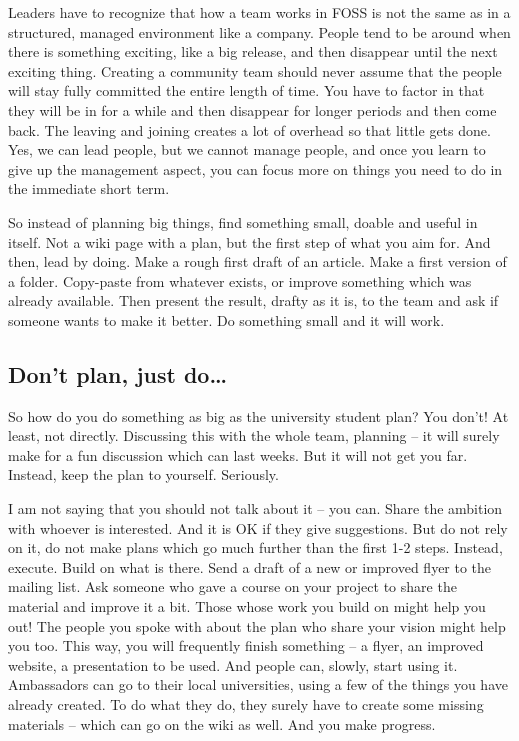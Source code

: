 Leaders have to recognize that how a team works in FOSS is not the same as in a
structured, managed environment like a company. People tend to be around when
there is something exciting, like a big release, and then disappear until the
next exciting thing. Creating a community team should never assume that the
people will stay fully committed the entire length of time. You have to factor
in that they will be in for a while and then disappear for longer periods and
then come back. The leaving and joining creates a lot of overhead so that little
gets done. Yes, we can lead people, but we cannot manage people, and once you
learn to give up the management aspect, you can focus more on things you need to
do in the immediate short term.

So instead of planning big things, find something small, doable and useful in
itself. Not a wiki page with a plan, but the first step of what you aim for. And
then, lead by doing. Make a rough first draft of an article. Make a first
version of a folder. Copy-paste from whatever exists, or improve something which
was already available. Then present the result, drafty as it is, to the team and
ask if someone wants to make it better. Do something small and it will work.

\subsection*{Don't plan, just do\dots}
So how do you do something as big as the university student plan? You don't! At
least, not directly. Discussing this with the whole team, planning -- it will
surely make for a fun discussion which can last weeks. But it will not get you
far. Instead, keep the plan to yourself. Seriously.

I am not saying that you should not talk about it -- you can. Share the ambition
with whoever is interested. And it is OK if they give suggestions. But do not
rely on it, do not make plans which go much further than the first 1-2 steps.
Instead, execute. Build on what is there. Send a draft of a new or improved
flyer to the mailing list. Ask someone who gave a course on your project to
share the material and improve it a bit. Those whose work you build on might
help you out! The people you spoke with about the plan who share your vision
might help you too. This way, you will frequently finish something -- a flyer,
an improved website, a presentation to be used. And people can, slowly, start
using it. Ambassadors can go to their local universities, using a few of the
things you have already created. To do what they do, they surely have to create
some missing materials -- which can go on the wiki as well. And you make
progress.

